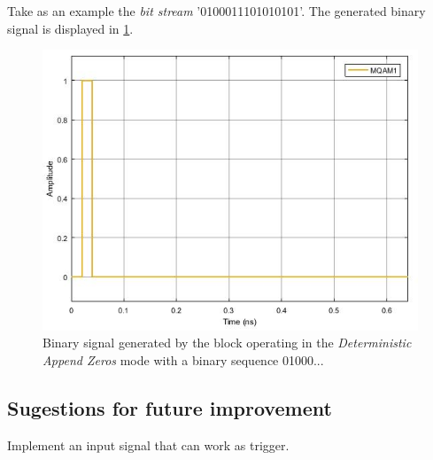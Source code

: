 Take as an example the \textit{bit stream} '0100011101010101'. The generated binary signal is displayed in \ref{MQAM1_DeterministAppendZeros}.

\begin{figure}
	\centering
	\includegraphics[width=\textwidth]{../m_qam_transmitter/figures/BinarySource_output}
	
	\caption{Binary signal generated by the block operating in the \textit{Deterministic Append Zeros} mode with a binary sequence 01000...}\label{MQAM1_DeterministAppendZeros}
\end{figure}

\subsection*{Sugestions for future improvement}

Implement an input signal that can work as trigger.


